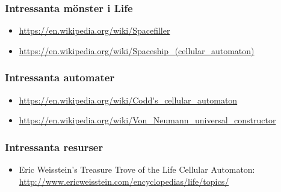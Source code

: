 \subsubsection{Intressanta mönster i Life}

\begin{itemize}[noitemsep,topsep=0pt]
    \item \url{https://en.wikipedia.org/wiki/Spacefiller}
    \item \url{https://en.wikipedia.org/wiki/Spaceship_(cellular_automaton)}
\end{itemize}

\subsubsection{Intressanta automater}

\begin{itemize}[noitemsep,topsep=0pt]
	\item \url{https://en.wikipedia.org/wiki/Codd's_cellular_automaton}
	\item \url{https://en.wikipedia.org/wiki/Von_Neumann_universal_constructor}
\end{itemize}

\subsubsection{Intressanta resurser}

\begin{itemize}[noitemsep,topsep=0pt]
    \item Eric Weisstein's Treasure Trove of the Life Cellular Automaton: \url{http://www.ericweisstein.com/encyclopedias/life/topics/}
\end{itemize}










